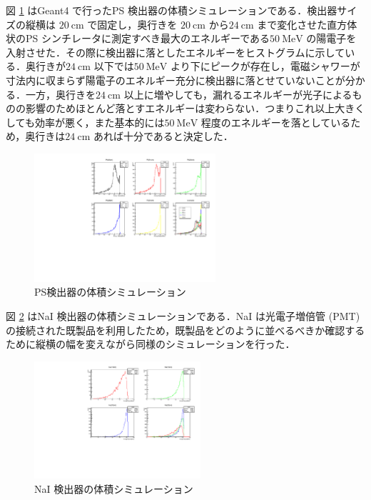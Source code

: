 図 \ref{PS_sim} はGeant4 で行ったPS 検出器の体積シミュレーションである．検出器サイズの縦横は $20~\mathrm{cm}$ で固定し，奥行きを $20~\mathrm{cm}$ から$24~\mathrm{cm}$ まで変化させた直方体状のPS シンチレータに測定すべき最大のエネルギーである$50~\mathrm{MeV}$ の陽電子を入射させた．その際に検出器に落としたエネルギーをヒストグラムに示している．奥行きが$24~\mathrm{cm}$ 以下では$50~\mathrm{MeV}$ より下にピークが存在し，電磁シャワーが寸法内に収まらず陽電子のエネルギー充分に検出器に落とせていないことが分かる．一方，奥行きを$24~\mathrm{cm}$ 以上に増やしても，漏れるエネルギーが光子によるものの影響のためほとんど落とすエネルギーは変わらない．つまりこれ以上大きくしても効率が悪く，また基本的には$50~\mathrm{MeV}$ 程度のエネルギーを落としているため，奥行きは$24~\mathrm{cm}$ あれば十分であると決定した．
\begin{figure}[H]
\centering
\includegraphics[width=0.6\textwidth,angle=-90]{figure/hayakawa/pl_20_24.pdf}
\caption{PS検出器の体積シミュレーション}
\label{PS_sim}
\end{figure}

図 \ref{NaI_sim} はNaI 検出器の体積シミュレーションである．NaI は光電子増倍管 (PMT) の接続された既製品を利用したため，既製品をどのように並べるべきか確認するために縦横の幅を変えながら同様のシミュレーションを行った．

\begin{figure}[H]
\centering
\includegraphics[width=0.55\textwidth,angle=-90]{figure/hayakawa/NaI_10_20.pdf}
\caption{NaI 検出器の体積シミュレーション}
\label{NaI_sim}
\end{figure}

